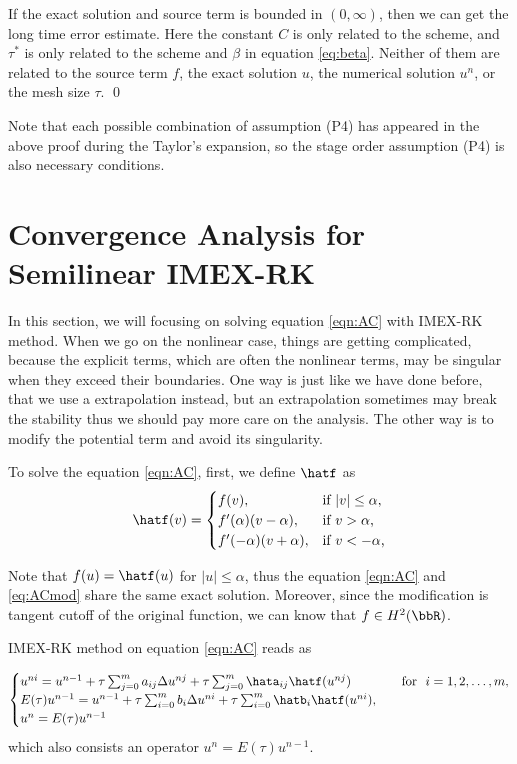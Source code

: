 If the exact solution and source term is bounded in $(0, \infty)$, then 
we can get the long time error estimate. 
Here the constant $C$ is only related to the scheme, 
and $\tau^*$ is only
related to the scheme and $\beta$ in equation \eqref{eq:beta}. 
Neither of them are related to the source term $f$,
the exact solution $u$, 
the numerical solution $u^n$, 
or the mesh size $\tau$. \qed

\begin{remark}
Note that each possible combination of assumption (P4) has appeared in the above proof during the Taylor's expansion, 
so the stage order assumption (P4) is also necessary conditions. 
\end{remark}

\section{Convergence Analysis for Semilinear IMEX-RK}

In this section, we will focusing on solving equation \eqref{eqn:AC} with IMEX-RK method. 
When we go on the nonlinear case, things are getting complicated, 
because the explicit terms, which are often the nonlinear terms, 
may be singular when they exceed their boundaries. 
One way is just like we have done before, 
that we use a extrapolation instead, 
but an extrapolation sometimes may break the stability thus 
we should pay more care on the analysis. 
The other way is to modify the potential term 
and avoid its singularity. 

To solve the equation \eqref{eqn:AC}, first, we define $\hatf$ as 
\begin{equation}\label{eq:ACmod}
    \hatf(v)= \begin{cases}
    f(v), & \text{if $\lvert v \rvert \leq \alpha$,}\\ 
    f'(\alpha)(v-\alpha), &\text{if $v > \alpha$,}\\ 
    f'(-\alpha)(v+\alpha), &\text{if $v < -\alpha$,}
\end{cases}\end{equation}

Note that $f(u) = \hatf(u)$ for $\lvert u \rvert \leq \alpha$, 
thus the equation \eqref{eqn:AC} and \eqref{eq:ACmod} share the same exact solution. 
Moreover, since the modification is tangent cutoff of the original function, 
we can know that $f \in H^2(\bbR)$. 


IMEX-RK method on equation \eqref{eqn:AC} reads as 


\begin{equation}\label{eq:RK-implicit-explicit-semilinear}
    \begin{cases}
    u^{ni} = u^{n-1} + \tau \sum_{j=0}^m a_{ij} \Delta u^{nj} + \tau \sum_{j=0}^m \hata_{ij} \hatf(u^{nj}) &\quad \text{for} ~~i=1,2,\dots,m, \\
    E(\tau) u^{n-1} = u^{n-1} + \tau \sum_{i=0}^m b_i \Delta u^{ni} + \tau \sum_{i=0}^m \hatb_i\hatf(u^{ni}), \\
    u^{n} = E(\tau) u^{n-1}
  \end{cases}
\end{equation}
which also consists an operator $u^{n} = E(\tau) u^{n-1}$. 

